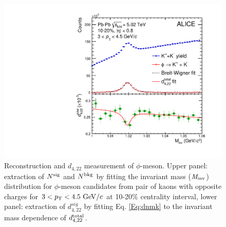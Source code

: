 \begin{figure}[!htb]
\begin{center}
\includegraphics[scale=0.45]{figures/analysisMethod/flowmass_Phi.pdf}
\end{center}
\caption{Reconstruction and $d_{4,22}$ measurement of $\phi$-meson. Upper panel: extraction of $N^{\rm{sig}}$ and $N^{\rm{bkg}}$ by fitting the invariant mass (${\it M}_{\rm{inv}}$) distribution for $\phi$-meson candidates from pair of kaons with opposite charges for $3<p_{\rm{T}}<4.5~{\rm GeV}/c$ at 10-20\% centrality interval, lower panel: extraction of $d_{4,22}^{sig}$ by fitting Eq. \ref{Eq:dnmk} to the invariant mass dependence of $d_{4,22}^{\rm total}$.}
\label{d422_phi_meson}
\end{figure}



